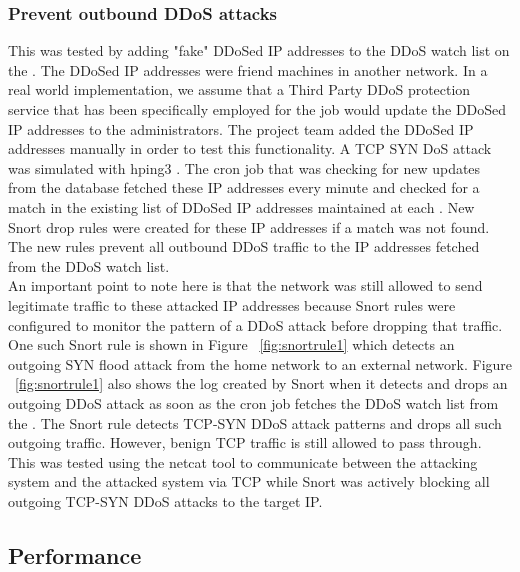 \subsubsection{Prevent outbound DDoS attacks}
\label{sec:eval:outddos}

This was tested by adding "fake" DDoSed IP addresses to the DDoS watch list on the \servname. The DDoSed IP addresses were friend machines in another network. In a real world implementation, we assume that a Third Party DDoS protection service \cite{DDoSPreventionTools} that has been specifically employed for the job would update the DDoSed IP addresses to the \sysname administrators. The project team added the DDoSed IP addresses manually in order to test this functionality. A TCP SYN DoS attack was simulated with hping3 \cite{hpingReferralPaper} \cite{hping}.  The cron job that was checking for new updates from the database fetched these IP addresses every minute and checked for a match in the existing list of DDoSed IP addresses maintained at each \nodename. New Snort drop rules were created for these IP addresses if a match was not found. The new rules prevent all outbound DDoS traffic to the IP addresses fetched from the DDoS watch list. \\

An important point to note here is that the network was still allowed to send legitimate traffic to these attacked IP addresses because Snort rules were configured to monitor the pattern of a DDoS attack before dropping that traffic. One such Snort rule is shown in Figure ~\ref{fig:snortrule1} which detects an outgoing SYN flood attack from the home network to an external network. Figure ~\ref{fig:snortrule1} also shows the log created by Snort when it detects and drops an outgoing DDoS attack as soon as the cron job fetches the DDoS watch list from the \servname. The Snort rule detects TCP-SYN DDoS attack patterns and drops all such outgoing traffic. However, benign TCP traffic is still allowed to pass through. This was tested using the netcat tool \cite{netcat} to communicate between the attacking system and the attacked system via TCP while Snort was actively blocking all outgoing TCP-SYN DDoS attacks to the target IP.

\subsection{Performance}
